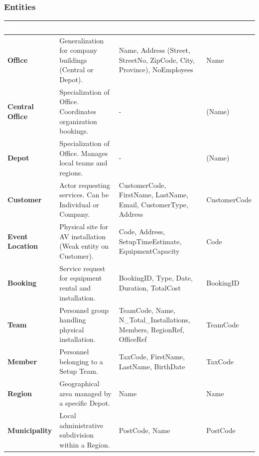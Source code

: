 \documentclass[12pt,a4paper]{article}
\begin{document}
\subsubsection*{Entities}
\begin{center}
\renewcommand{\arraystretch}{1.5}
\small
\begin{tabular}{|p{}|p{}|p{}|p{}|}
\hline
\rowcolor[rgb]{0.1, 0.3, 0.5} 
\textcolor{white}{\textbf{Entity}} & \textcolor{white}{\textbf{Description}} & \textcolor{white}{\textbf{Attributes}} & \textcolor{white}{\textbf{Identifier}} \\ \hline
\textbf{Office} & Generalization for company buildings (Central or Depot). & Name, Address (Street, StreetNo, ZipCode, City, Province), NoEmployees & Name \\ \hline
\textbf{Central Office} & Specialization of Office. Coordinates organization bookings. & - & (Name) \\ \hline
\textbf{Depot} & Specialization of Office. Manages local teams and regions. & - & (Name) \\ \hline
\textbf{Customer} & Actor requesting services. Can be Individual or Company. & CustomerCode, FirstName, LastName, Email, CustomerType, Address & CustomerCode \\ \hline
\textbf{Event Location} & Physical site for AV installation (Weak entity on Customer). & Code, Address, SetupTimeEstimate, EquipmentCapacity & Code \\ \hline
\textbf{Booking} & Service request for equipment rental and installation. & BookingID, Type, Date, Duration, TotalCost & BookingID \\ \hline
\textbf{Team} & Personnel group handling physical installation. & TeamCode, Name, N\_Total\_Installations, Members, RegionRef, OfficeRef & TeamCode \\ \hline
\textbf{Member} & Personnel belonging to a Setup Team. & TaxCode, FirstName, LastName, BirthDate & TaxCode \\ \hline
\textbf{Region} & Geographical area managed by a specific Depot. & Name & Name \\ \hline
\textbf{Municipality} & Local administrative subdivision within a Region. & PostCode, Name & PostCode \\ \hline
\end{tabular}
\end{center}
\end{document}
